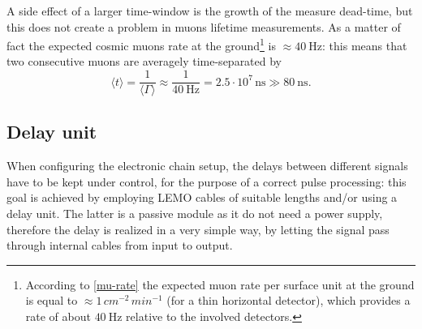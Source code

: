A side effect of a larger time-window is the growth of the measure dead-time, but this does not create a problem in muons lifetime measurements. As a matter of fact the expected cosmic muons rate at the ground\footnote{According to \eqref{mu-rate} the expected muon rate per surface unit at the ground is equal to $\approx 1\,\si{cm^{-2}} \,\si{min^{-1}}$ (for a thin horizontal detector), which provides a rate of about $\SI{40}{\hertz}$ relative to the involved detectors.} is $\approx \SI{40}{\hertz}$: this means that two consecutive muons are averagely time-separated by
\begin{displaymath}
\langle t \rangle  = \frac{1}{\langle \Gamma \rangle} \approx \frac{1}{\SI{40}{\hertz}}=2.5\cdot 10^7\,\si{\nano\second}\gg \SI{80}{\nano\second}.
\end{displaymath}

\subsection{Delay unit}
When configuring the electronic chain setup, the delays between different signals have to be kept under control, for the purpose of a correct pulse processing: this goal is achieved by employing LEMO cables of suitable lengths and/or using a delay unit. The latter is a passive module as it do not need a power supply, therefore the delay is realized in a very simple way, by letting the signal pass through internal cables from input to output.\\

